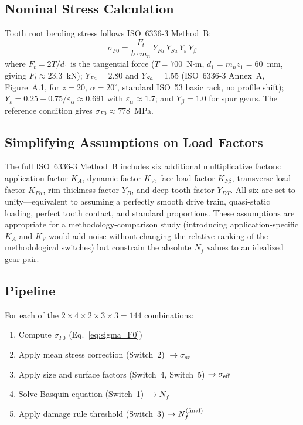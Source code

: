 \documentclass[12pt,a4paper]{article}
\begin{document}
\subsection{Nominal Stress Calculation}

Tooth root bending stress follows ISO~6336-3 Method~B:
\begin{equation}
\label{eq:sigma_F0}
\sigma_{F0} = \frac{F_t}{b \cdot m_n} \,
Y_{Fa} \, Y_{Sa} \, Y_\varepsilon \, Y_\beta
\end{equation}
where $F_t = 2T/d_1$ is the tangential force ($T=700$~N$\cdot$m,
$d_1 = m_n z_1 = 60$~mm, giving $F_t \approx 23.3$~kN);
$Y_{Fa}=2.80$ and $Y_{Sa}=1.55$ (ISO~6336-3 Annex~A, Figure~A.1,
for $z=20$, $\alpha=20^\circ$, standard ISO~53 basic rack, no profile
shift); $Y_\varepsilon = 0.25 + 0.75/\varepsilon_\alpha \approx 0.691$
with $\varepsilon_\alpha \approx 1.7$; and $Y_\beta = 1.0$ for spur
gears. The reference condition gives $\sigma_{F0} \approx 778$~MPa.

\subsection{Simplifying Assumptions on Load Factors}

The full ISO~6336-3 Method~B includes six additional multiplicative
factors: application factor $K_A$, dynamic factor $K_V$, face load
factor $K_{F\beta}$, transverse load factor $K_{F\alpha}$, rim
thickness factor $Y_B$, and deep tooth factor $Y_{DT}$. All six are set
to unity---equivalent to assuming a perfectly smooth drive train,
quasi-static loading, perfect tooth contact, and standard proportions.
These assumptions are appropriate for a methodology-comparison study
(introducing application-specific $K_A$ and $K_V$ would add noise
without changing the relative ranking of the methodological switches)
but constrain the absolute $N_f$ values to an idealized gear pair.

\subsection{Pipeline}

For each of the $2\times4\times2\times3\times3 = 144$ combinations:
\begin{enumerate}
  \item Compute $\sigma_{F0}$ (Eq.~\ref{eq:sigma_F0})
  \item Apply mean stress correction (Switch~2) $\rightarrow \sigma_{ar}$
  \item Apply size and surface factors (Switch~4, Switch~5)
        $\rightarrow \sigma_{\rm eff}$
  \item Solve Basquin equation (Switch~1) $\rightarrow N_f$
  \item Apply damage rule threshold (Switch~3)
        $\rightarrow N_f^{\rm (final)}$
\end{enumerate}
\end{document}
